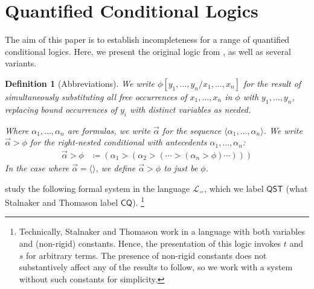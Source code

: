 \documentclass[12pt]{article}
\newtheorem{definition}{Definition}
\newcommand{\tup}[1]{\langle #1 \rangle}
\newcommand{\would}{\mathbin{>}}
\begin{document}
\section{Quantified Conditional Logics}
\label{Section:Logics}

The aim of this paper is to establish incompleteness for a range of quantified conditional logics. 
Here, we present the original logic from \cite{StalnakerThomason1970}, as well as several variants. 

\begin{definition}[Abbreviations]
    We write $\phi[y_1,\dots,y_n/x_1,\dots,x_n]$ for the result of simultaneously substituting all free occurrences of $x_1,\dots,x_n$ in $\phi$ with $y_1,\dots,y_n$, replacing bound occurrences of $y_i$ with distinct variables as needed. 
    
    Where $\alpha_1,\dots,\alpha_n$ are formulas, we write $\vec{\alpha}$ for the sequence $\tup{\alpha_1,\dots,\alpha_n}$. 
    We write $\vec{\alpha} \would \phi$ for the right-nested conditional with antecedents $\alpha_1,\dots,\alpha_n$:
    \begin{align*}
        \vec{\alpha} \would \phi & \coloneqq (\alpha_1 \would (\alpha_2 \would (\cdots \would (\alpha_n \would \phi)\cdots)))
    \end{align*}
    In the case where $\vec{\alpha} = \tup{}$, we define $\vec{\alpha} \would \phi$ to just be $\phi$. 
\end{definition}

\cite[pp.\,30--31]{StalnakerThomason1970} study the following formal system in the language $\mathcal{L}_=$, which we label $\mathsf{QST}$ (what Stalnaker and Thomason label $\mathsf{CQ}$).%
\footnote{
    Technically, Stalnaker and Thomason work in a language with both variables and (non-rigid) constants. 
    Hence, the presentation of this logic invokes $t$ and $s$ for arbitrary terms. 
    The presence of non-rigid constants does not substantively affect any of the results to follow, so we work with a system without such constants for simplicity. 
    } %
\end{document}
